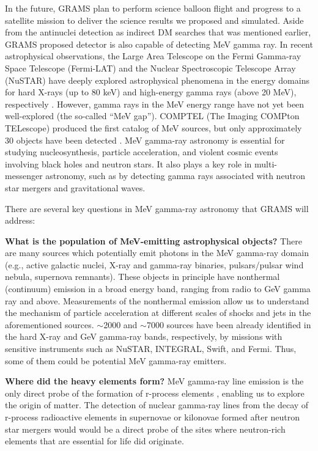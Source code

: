 In the future, \ac{GRAMS} plan to perform science balloon flight and progress to a satellite mission to deliver the science results we proposed and simulated. Aside from the antinuclei detection as indirect \ac{DM} searches that was mentioned earlier, \ac{GRAMS} proposed detector is also capable of detecting MeV gamma ray. In recent astrophysical observations, the Large Area Telescope on the Fermi Gamma-ray Space Telescope (Fermi-LAT) and the Nuclear Spectroscopic Telescope Array (NuSTAR) have deeply explored astrophysical phenomena in the energy domains for hard X-rays (up to 80 keV) and high-energy gamma rays (above 20 MeV), respectively \cite{Atwood_2009, Harrison_2013}. However, gamma rays in the MeV energy range have not yet been well-explored (the so-called “MeV gap”). COMPTEL (The Imaging COMPton TELescope) produced the first catalog of MeV sources, but only approximately 30 objects have been detected \cite{refId0}. MeV gamma-ray astronomy is essential for studying nucleosynthesis, particle acceleration, and violent cosmic events involving black holes and neutron stars. It also plays a key role in multi-messenger astronomy, such as by detecting gamma rays associated with neutron star mergers and gravitational waves.

There are several key questions in MeV gamma-ray astronomy that \ac{GRAMS} will address:

\noindent\textbf{What is the population of MeV-emitting astrophysical objects?} There are many sources which potentially emit photons in the MeV gamma-ray domain (e.g., active galactic nuclei, X-ray and gamma-ray binaries, pulsars/pulsar wind nebula, supernova remnants). These objects in principle have nonthermal (continuum) emission in a broad energy band, ranging from radio to GeV gamma ray and above. Measurements of the nonthermal emission allow us to understand the mechanism of particle acceleration at different scales of shocks and jets in the aforementioned sources. $\sim$2000 and $\sim$7000 sources have been already identified in the hard X-ray and GeV gamma-ray bands, respectively, by missions with sensitive instruments such as NuSTAR, INTEGRAL, Swift, and Fermi. Thus, some of them could be potential MeV gamma-ray emitters.

\noindent\textbf{Where did the heavy elements form?} MeV gamma-ray line emission is the only direct probe of the formation of r-process elements \cite{korobkin-r-proc,metzger-r-proc}, enabling us to explore the origin of matter. The detection of nuclear gamma-ray lines from the decay of r-process radioactive elements in supernovae or kilonovae formed after neutron star mergers would would be a direct probe of the sites where neutron-rich elements that are essential for life did originate.

